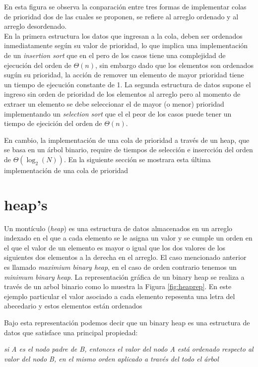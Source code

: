 \documentclass[letterpaper]{article}
\begin{document}
En esta figura se observa la conparación entre tres formas de implementar colas de prioridad dos de las cuales se proponen, se refiere al arreglo ordenado y al arreglo desordenado.\\

En la primera estructura los datos que ingresan a la cola, deben ser ordenados inmediatamente según su valor de prioridad, lo que implica una implementación de un \textit{insertion sort} que en el pero de los casos tiene una complejidad de ejecución del orden de $\Theta(n)$, sin embargo dado que los elementos son ordenados sugún su prioridad, la acción de remover un elemento de mayor prioridad tiene un tiempo de ejecución constante de 1. La segunda estructura de datos supone el ingreso sin orden de prioridad de los elementos al arreglo pero al momento de extraer un elemento se debe seleccionar el de mayor (o menor) prioridad implementando un \textit{selection sort} que el el peor de los casos puede tener un tiempo de ejecición del orden de $\Theta(n)$.

En cambio, la implementación de una cola de prioridad a través de un heap, que se basa en un árbol binario, require de tiempos de selección e insercción del orden de $\Theta(\log_{2}(N))$. En la siguiente sección se mostrara esta última implementación de una cola de prioridad

\section{heap's}

Un montículo (\textit{heap}) es una estructura de datos almacenados en un arreglo indexado en el que a cada elemento se le asigna un valor y se cumple un orden en el que el valor de un elemento es mayor o igual que los dos valores de los siguientes dos elementos a la derecha en el arreglo. El caso mencionado anterior es llamado \textit{maximium binary heap}, en el caso de orden contrario tenemos un \textit{minimum binary heap}. La representación gráfica de un binary heap se realiza a través de un arbol binario como lo muestra la Figura \ref{fig:heaprep}. En este ejemplo particular el valor asociado a cada elemento repesenta una letra del abecedario y estos elementos están ordenados 

Bajo esta representación podemos decir que un binary heap es una estructura de datos que satisface una principal propiedad: 

\textit{si A es el nodo padre de B, entonces el valor del nodo A está ordenado respecto al valor del nodo B, en el mismo orden aplicado a través del todo el árbol}
\end{document}
